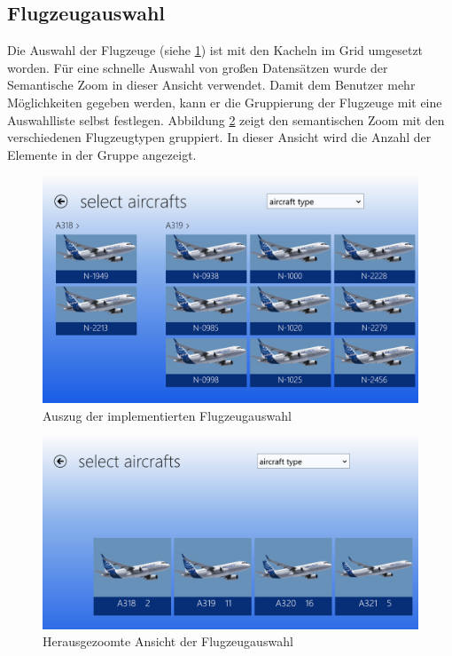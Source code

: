 \subsection{Flugzeugauswahl}
Die Auswahl der Flugzeuge (siehe \ref{aircraftSelectionImpl}) ist mit den Kacheln im Grid umgesetzt worden. Für eine schnelle Auswahl von großen Datensätzen wurde der Semantische Zoom in dieser Ansicht verwendet. Damit dem Benutzer mehr Möglichkeiten gegeben werden, kann er die Gruppierung der Flugzeuge mit eine Auswahlliste selbst festlegen. Abbildung \ref{aircraftSelectionZoomImpl} zeigt den semantischen Zoom mit den verschiedenen Flugzeugtypen gruppiert.  In dieser Ansicht wird die Anzahl der Elemente in der Gruppe angezeigt. 
\begin{figure}[H]
\centering
\includegraphics[width=\hsize]{images/impl/select_aircrafts_impl}
\caption{Auszug der implementierten Flugzeugauswahl}
\label{aircraftSelectionImpl}
\end{figure}
\begin{figure}[H]
\centering
\includegraphics[width=\hsize]{images/impl/semantic_zoom_impl}
\caption{Herausgezoomte Ansicht der Flugzeugauswahl}
\label{aircraftSelectionZoomImpl}
\end{figure}

